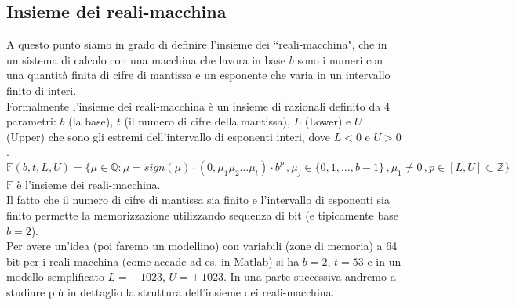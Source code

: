 \documentclass[12pt]{article}
\begin{document}
\subsection{Insieme dei reali-macchina}
A questo punto siamo in grado di definire l'insieme dei ``reali-macchina", che in un sistema di calcolo con una macchina che lavora in base $b$ sono i numeri con una quantità finita di cifre di mantissa e un esponente che varia in un intervallo finito di interi. \\
Formalmente l'insieme dei reali-macchina è un insieme di razionali definito da 4 parametri: $b$ (la base), $t$ (il numero di cifre della mantissa), $L$ (Lower) e $U$ (Upper) che sono gli estremi dell'intervallo di esponenti interi, dove $L < 0$ e $U > 0$.
\[ \mathbb{F} (b, t, L, U) = \{ \mu \in \mathbb{Q} \colon \mu = sign(\mu)\cdot(0,\mu_1 \mu_2 \dotsc \mu_t) \cdot b^p \,, \mu_j \in \{0, 1, \dotsc , b-1\} \,, \mu_1 \ne 0 \,, p \in [L,U] \subset \mathbb{Z} \} \]
$\mathbb{F}$ è l'insieme dei reali-macchina.\\
Il fatto che il numero di cifre di mantissa sia finito e l'intervallo di esponenti sia finito permette la memorizzazione utilizzando sequenza di bit (e tipicamente base $b=2$). \\
Per avere un'idea (poi faremo un modellino) con variabili (zone di memoria) a 64 bit per i reali-macchina (come accade ad es. in Matlab) si ha $b=2$, $t=53$ e in un modello semplificato $L=-\,1023$, $U=+\,1023$. In una parte successiva andremo a studiare più in dettaglio la struttura dell'insieme dei reali-macchina.
\end{document}
